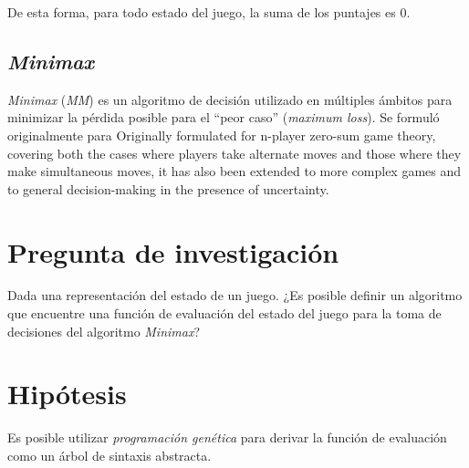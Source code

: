 \documentclass[submission]{eptcs}
\begin{document}
      De esta forma, para todo estado del juego, la suma de los puntajes es 0.

    \subsection{\textit{Minimax}}
      \textit{Minimax}\cite{wiki-minimax, neumann1928theorie, fan1953minimax} (\textit{MM}) es un 
      algoritmo de decisión utilizado en múltiples ámbitos para minimizar la pérdida posible para 
      el \enquote{peor caso} (\textit{maximum loss}). 
      Se formuló originalmente para Originally formulated for n-player zero-sum game theory, covering both the cases where players take alternate moves and those where they make simultaneous moves, it has also been extended to more complex games and to general decision-making in the presence of uncertainty.











  \section{Pregunta de investigación}
    Dada una representación del estado de un juego. 
    ¿Es posible definir un algoritmo que encuentre una función de evaluación del estado del juego 
    para la toma de decisiones del algoritmo \textit{Minimax}?

  \section{Hipótesis}
    Es posible utilizar \textit{programación genética} para derivar la función de evaluación como
    un árbol de sintaxis abstracta.
\end{document}
